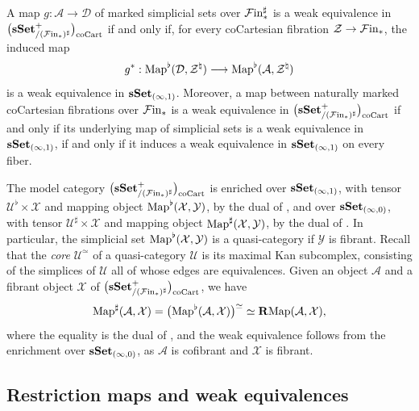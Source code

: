 \documentclass[10pt,reqno]{amsart}
\begin{document}
\begin{proposition}
\label{prop:cocartesian_weak_equivalences}
A map $g:\mathcal A\to\mathcal D$ of marked simplicial sets over
$\mathcal{F}\mathrm{in}_*^\sharp$ is a weak equivalence in $\bigl(\mathbf{sSet}^+_{/(\mathcal{F}\mathrm{in}_*)^\sharp}\bigr)_{\mathrm{coCart}}$ if and only
if, for every coCartesian fibration $\mathcal Z\to\mathcal{F}\mathrm{in}_*$, the
induced map
\[
g^*:\operatorname{Map}^\flat(\mathcal D,\mathcal Z^\natural)
\longrightarrow\operatorname{Map}^\flat(\mathcal A,\mathcal Z^\natural)
\]
is a weak equivalence in $\mathbf{sSet}_{(\infty,1)}$. Moreover, a map
between naturally marked coCartesian fibrations over $\mathcal{F}\mathrm{in}_*$ is a
weak equivalence in $\bigl(\mathbf{sSet}^+_{/(\mathcal{F}\mathrm{in}_*)^\sharp}\bigr)_{\mathrm{coCart}}$ if and only if its underlying map of
simplicial sets is a weak equivalence in $\mathbf{sSet}_{(\infty,1)}$, if
and only if it induces a weak equivalence in $\mathbf{sSet}_{(\infty,1)}$ on
every fiber.
\end{proposition}

The model category $\bigl(\mathbf{sSet}^+_{/(\mathcal{F}\mathrm{in}_*)^\sharp}\bigr)_{\mathrm{coCart}}$ is enriched over
$\mathbf{sSet}_{(\infty,1)}$, with tensor $\mathcal U^\flat\times\mathcal X$
and mapping object $\operatorname{Map}^\flat(\mathcal X,\mathcal Y)$, by the dual
of \cite[Remark~3.1.4.5]{lurie2009higher}, and over
$\mathbf{sSet}_{(\infty,0)}$, with tensor
$\mathcal U^\sharp\times\mathcal X$ and mapping object
$\operatorname{Map}^\sharp(\mathcal X,\mathcal Y)$, by the dual of
\cite[Corollary~3.1.4.4]{lurie2009higher}. In particular, the
simplicial set $\operatorname{Map}^\flat(\mathcal X,\mathcal Y)$ is a
quasi-category if $\mathcal Y$ is fibrant. Recall that the
\emph{core} $\mathcal U^\simeq$ of a quasi-category $\mathcal U$
is its maximal Kan subcomplex, consisting of the simplices of
$\mathcal U$ all of whose edges are equivalences. Given an object
$\mathcal A$ and a fibrant object $\mathcal X$ of $\bigl(\mathbf{sSet}^+_{/(\mathcal{F}\mathrm{in}_*)^\sharp}\bigr)_{\mathrm{coCart}}$, we
have
\begin{equation}
\label{eq:marked_mapping_core}
\operatorname{Map}^\sharp(\mathcal A,\mathcal X)
=\bigl(\operatorname{Map}^\flat(\mathcal A,\mathcal X)\bigr)^\simeq
\simeq\mathbf{R}\mathrm{Map}(\mathcal A,\mathcal X),
\end{equation}
where the equality is the dual of
\cite[Remark~3.1.3.1]{lurie2009higher}, and the weak equivalence
follows from the enrichment over $\mathbf{sSet}_{(\infty,0)}$, as
$\mathcal A$ is cofibrant and $\mathcal X$ is fibrant.

\subsection{Restriction maps and weak equivalences}
\label{subsec:enriched_mapping_fibrations}
\end{document}
